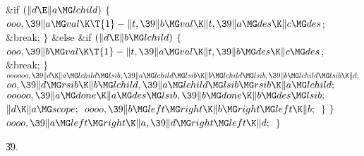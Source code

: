\&{if} ${}(\|d\E\|a\MG\\{lchild}){}$\5
${}\{{}$\1\6
${}\\{ooo},\39\|a\MG\\{val}\K\T{1}-\|t,\39\|b\MG\\{val}\K\|t,\39\|a\MG\\{des}\K%
\|c\MG\\{des}{}$;\5
\&{break};\6
\4${}\}{}$\5
\2\&{else} \&{if} ${}(\|d\E\|b\MG\\{lchild}){}$\5
${}\{{}$\1\6
${}\\{ooo},\39\|b\MG\\{val}\K\T{1}-\|t,\39\|a\MG\\{val}\K\|t,\39\|b\MG\\{des}\K%
\|c\MG\\{des}{}$;\5
\&{break};\6
\4${}\}{}$\2\2\2\6
${}\\{oooooo},\39\|d\K\|a\MG\\{lchild}\MG\\{lsib},\39\|a\MG\\{lchild}\MG%
\\{lsib}\K\|b\MG\\{lchild}\MG\\{lsib},\39\|b\MG\\{lchild}\MG\\{lsib}\K\|d;{}$\6
${}\\{oo},\39\|d\MG\\{rsib}\K\|b\MG\\{lchild},\39\|a\MG\\{lchild}\MG\\{lsib}\MG%
\\{rsib}\K\|a\MG\\{lchild};{}$\6
${}\\{ooooo},\39\|a\MG\\{done}\K\|a\MG\\{des}\MG\\{lsib},\39\|b\MG\\{done}\K\|b%
\MG\\{des}\MG\\{lsib};{}$\6
${}\|d\K\|a\MG\\{scope};{}$\6
${}\\{oooo},\39\|b\MG\\{left}\MG\\{right}\K\|b\MG\\{right}\MG\\{left}\K\|b;{}$\6
\4${}\}{}$\2\6
\4${}\}{}$\2\6
${}\\{oooo},\39\|a\MG\\{left}\MG\\{right}\K\|a,\39\|d\MG\\{right}\MG\\{left}\K%
\|d;{}$\6
\4${}\}{}$\2\par
\U39.\fi

